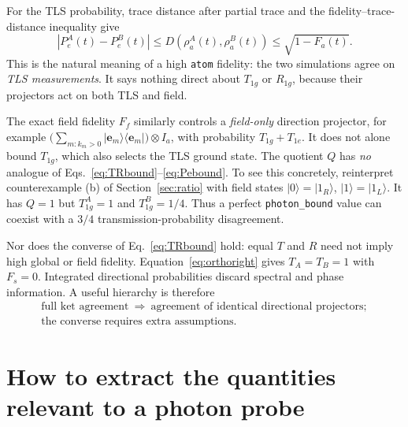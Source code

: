 \documentclass[11pt,a4paper]{article}
\newcommand{\ket}[1]{\lvert #1\rangle}
\newcommand{\bra}[1]{\langle #1\rvert}
\newcommand{\code}[1]{\nolinkurl{#1}}
\begin{document}
For the TLS probability, trace distance after partial trace and the fidelity--trace-distance inequality give
\begin{equation}
 |P_e^A(t)-P_e^B(t)|
 \le D(\rho_a^A(t),\rho_a^B(t))
 \le\sqrt{1-F_a(t)}.
 \label{eq:Pebound}
\end{equation}
This is the natural meaning of a high \code{atom} fidelity: the two simulations agree on \emph{TLS measurements}. It says nothing direct about $T_{1g}$ or $R_{1g}$, because their projectors act on both TLS and field.

The exact field fidelity $F_f$ similarly controls a \emph{field-only} direction projector, for example $\bigl(\sum_{m:k_m>0}\ket{\mathbf e_m}\bra{\mathbf e_m}\bigr)\otimes I_a$, with probability $T_{1g}+T_{1e}$. It does not alone bound $T_{1g}$, which also selects the TLS ground state. The quotient $Q$ has \emph{no} analogue of Eqs.~\eqref{eq:TRbound}--\eqref{eq:Pebound}. To see this concretely, reinterpret counterexample (b) of Section~\ref{sec:ratio} with field states $\ket0=\ket{1_{R}}$, $\ket1=\ket{1_{L}}$. It has $Q=1$ but $T_{1g}^A=1$ and $T_{1g}^B=1/4$. Thus a perfect \code{photon_bound} value can coexist with a $3/4$ transmission-probability disagreement.

Nor does the converse of Eq.~\eqref{eq:TRbound} hold: equal $T$ and $R$ need not imply high global or field fidelity. Equation~\eqref{eq:orthoright} gives $T_A=T_B=1$ with $F_s=0$. Integrated directional probabilities discard spectral and phase information. A useful hierarchy is therefore
\begin{equation}
 \begin{gathered}
 \text{full ket agreement}\ \Longrightarrow\
 \text{agreement of identical directional projectors};\\
 \text{the converse requires extra assumptions.}
 \end{gathered}
 \label{eq:hierarchy}
\end{equation}

\section{How to extract the quantities relevant to a photon probe}
\label{sec:protocol}
\end{document}
